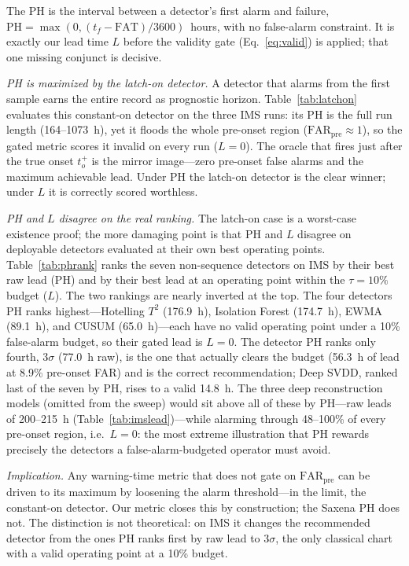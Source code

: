\documentclass[IJPHM, 2026, 0]{PHMSociety}
\begin{document}
The PH is the interval between a detector's first alarm and failure, $\text{PH} = \max(0, (t_f - \text{FAT})/3600)$~hours, with no false-alarm constraint. It is exactly our lead time $L$ before the validity gate (Eq.~\ref{eq:valid}) is applied; that one missing conjunct is decisive.

\emph{PH is maximized by the latch-on detector.} A detector that alarms from the first sample earns the entire record as prognostic horizon. Table~\ref{tab:latchon} evaluates this constant-on detector on the three IMS runs: its PH is the full run length (164--1073~h), yet it floods the whole pre-onset region ($\text{FAR}_{\text{pre}} \approx 1$), so the gated metric scores it invalid on every run ($L=0$). The oracle that fires just after the true onset $t_o^+$ is the mirror image---zero pre-onset false alarms and the maximum achievable lead. Under PH the latch-on detector is the clear winner; under $L$ it is correctly scored worthless.

\emph{PH and $L$ disagree on the real ranking.} The latch-on case is a worst-case existence proof; the more damaging point is that PH and $L$ disagree on deployable detectors evaluated at their own best operating points. Table~\ref{tab:phrank} ranks the seven non-sequence detectors on IMS by their best raw lead (PH) and by their best lead at an operating point within the $\tau=10\%$ budget ($L$). The two rankings are nearly inverted at the top. The four detectors PH ranks highest---Hotelling $T^2$ (176.9~h), Isolation Forest (174.7~h), EWMA (89.1~h), and CUSUM (65.0~h)---each have no valid operating point under a 10\% false-alarm budget, so their gated lead is $L=0$. The detector PH ranks only fourth, $3\sigma$ (77.0~h raw), is the one that actually clears the budget (56.3~h of lead at 8.9\% pre-onset FAR) and is the correct recommendation; Deep SVDD, ranked last of the seven by PH, rises to a valid 14.8~h. The three deep reconstruction models (omitted from the sweep) would sit above all of these by PH---raw leads of 200--215~h (Table~\ref{tab:imslead})---while alarming through 48--100\% of every pre-onset region, i.e.\ $L=0$: the most extreme illustration that PH rewards precisely the detectors a false-alarm-budgeted operator must avoid.

\emph{Implication.} Any warning-time metric that does not gate on $\text{FAR}_{\text{pre}}$ can be driven to its maximum by loosening the alarm threshold---in the limit, the constant-on detector. Our metric closes this by construction; the Saxena PH does not. The distinction is not theoretical: on IMS it changes the recommended detector from the ones PH ranks first by raw lead to $3\sigma$, the only classical chart with a valid operating point at a 10\% budget.
\end{document}

